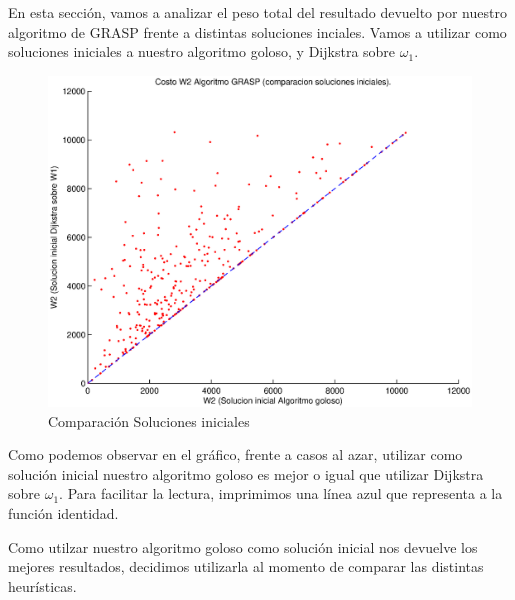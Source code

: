 En esta sección, vamos a analizar el peso total del resultado devuelto por nuestro algoritmo de GRASP frente a distintas soluciones inciales. Vamos a utilizar como soluciones iniciales a nuestro algoritmo goloso, y Dijkstra sobre $\omega_1$.

\begin{figure}[H]
  \begin{center}
    \begin{minipage}{0.5\linewidth}
      \includegraphics[width=\linewidth]{graficos/grasp_comparacion_soluciones_iniciales.eps}
      \caption{Comparación Soluciones iniciales}\label{fig:grasp-proporcion}
    \end{minipage}
  \end{center}
\end{figure}

Como podemos observar en el gráfico, frente a casos al azar, utilizar como solución inicial nuestro algoritmo goloso es mejor o igual que utilizar Dijkstra sobre $\omega_1$. Para facilitar la lectura, imprimimos una línea azul que representa a la función identidad.

Como utilzar nuestro algoritmo goloso como solución inicial nos devuelve los mejores resultados, decidimos utilizarla al momento de comparar las distintas heurísticas.
